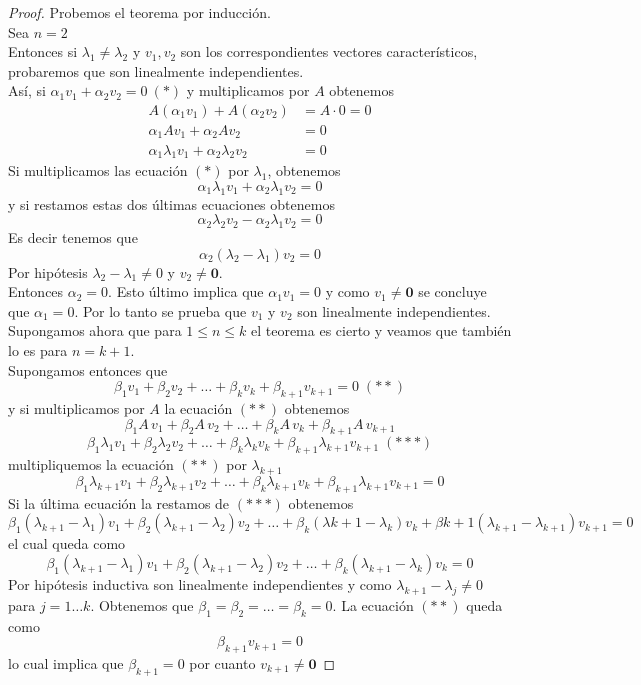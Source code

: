 \begin{proof}
Probemos el teorema por inducción.\\
Sea $n=2$\\
Entonces si $\lambda_1 \neq \lambda_2$ y $v_1 , v_2$ son los correspondientes vectores característicos, probaremos que son linealmente independientes.\\
Así, si $\alpha_1 v_1 + \alpha_2 v_2 = 0 \: (*)$ y multiplicamos por $A$ obtenemos 
\begin{align*}
A(\alpha_1 v_1) + A(\alpha_2 v_2) &= A \cdot 0 = 0\\
\alpha_1 A v_1 + \alpha_2 A v_2 &=0\\
\alpha_1 \lambda_1 v_1 + \alpha_2 \lambda_2 v_2 &= 0
\end{align*}
Si multiplicamos las ecuación $(*)$ por $\lambda_1$, obtenemos
$$\alpha_1 \lambda_1 v_1 + \alpha_2 \lambda_1 v_2 = 0$$
y si restamos estas dos últimas ecuaciones obtenemos $$\alpha_2 \lambda_2 v_2 - \alpha_2 \lambda_1 v_2 = 0$$
Es decir tenemos que $$\alpha_2 (\lambda_2 - \lambda_1)v_2 = 0$$
Por hipótesis $\lambda_2 -\lambda_1 \neq 0$ y $v_2 \neq \mathbf{0}$.\\
Entonces $\alpha_2 = 0$. Esto último implica que $\alpha_1 v_1 =0$ y como $v_1 \neq \mathbf{0}$ se concluye que $\alpha_1 =0$. Por lo tanto se prueba que $v_1$ y $v_2$ son linealmente independientes.\\
Supongamos ahora que para $1\leq n \leq k$ el teorema es cierto y veamos que también lo es para $n =k+1$.\\
Supongamos entonces que 
$$\beta_1 v_1 +\beta_2 v_2 + \ldots + \beta_k v_k + \beta_{k+1} v_{k+1}= 0\;(**)$$
y si multiplicamos por $A$ la ecuación $(**)$ obtenemos
$$\beta_1 A\, v_1 + \beta_2 A\, v_2 + \ldots +\beta_k A\, v_k + \beta_{k+1} A\, v_{k+1}$$
$$\beta_1 \lambda_1 v_1 + \beta_2 \lambda_2 v_2 + \ldots + \beta_k \lambda_k v_k + \beta_{k+1} \lambda_{k+1} v_{k+1}\; (***)$$
multipliquemos la ecuación $(**)$ por $\lambda_{k+1}$
$$\beta_1 \lambda_{k+1} v_1 + \beta_{2} \lambda_{k+1} v_2 + \ldots + \beta_{k} \lambda_{k+1} v_k + \beta_{k+1} \lambda_{k+1} v_{k+1} = 0$$
Si la última ecuación la restamos de $(***)$ obtenemos
$$\beta_1 (\lambda_{k+1} - \lambda_1)v_1 + \beta_2(\lambda_{k+1}- \lambda_2)v_2 + \ldots + \beta_k (\lambda{k+1} - \lambda_k)v_k + \beta{k+1}(\lambda_{k+1} - \lambda_{k+1})v_{k+1} =0$$
el cual queda como
$$\beta_1(\lambda_{k+1}-\lambda_1)v_1 + \beta_2 (\lambda_{k+1} - \lambda_2)v_2 + \ldots + \beta_k(\lambda_{k+1}-\lambda_k)v_k =0$$
Por hipótesis inductiva  son linealmente independientes y como $\lambda_{k+1}-\lambda_j \neq 0$ para $j = 1 \ldots k$. Obtenemos que $\beta_1 = \beta_2 = \ldots = \beta_k =0$.
La ecuación $(**)$ queda como
$$\beta_{k+1} v_{k+1} =0$$
lo cual implica que $\beta_{k+1}=0$ por cuanto $v_{k+1}\neq \mathbf{0}$
\end{proof}





